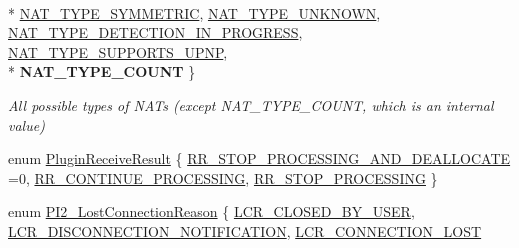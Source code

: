 \begin{DoxyCompactItemize}
\\*
\hyperlink{namespace_rak_net_a81848fd95488939c0b3e217209f31139a0fe9820fcb6c01ea039c04165f8a38f8}{N\-A\-T\-\_\-\-T\-Y\-P\-E\-\_\-\-S\-Y\-M\-M\-E\-T\-R\-I\-C}, 
\hyperlink{namespace_rak_net_a81848fd95488939c0b3e217209f31139a0f4cdc67acdc19e4287f0b44a0c91945}{N\-A\-T\-\_\-\-T\-Y\-P\-E\-\_\-\-U\-N\-K\-N\-O\-W\-N}, 
\hyperlink{namespace_rak_net_a81848fd95488939c0b3e217209f31139abd9c6bf5948fea28bf8d8513a4ef1b1d}{N\-A\-T\-\_\-\-T\-Y\-P\-E\-\_\-\-D\-E\-T\-E\-C\-T\-I\-O\-N\-\_\-\-I\-N\-\_\-\-P\-R\-O\-G\-R\-E\-S\-S}, 
\hyperlink{namespace_rak_net_a81848fd95488939c0b3e217209f31139a16b9a0a7400130f9f1b046426a8ae7d0}{N\-A\-T\-\_\-\-T\-Y\-P\-E\-\_\-\-S\-U\-P\-P\-O\-R\-T\-S\-\_\-\-U\-P\-N\-P}, 
\\*
{\bfseries N\-A\-T\-\_\-\-T\-Y\-P\-E\-\_\-\-C\-O\-U\-N\-T}
 \}
\begin{DoxyCompactList}\small\item\em All possible types of N\-A\-Ts (except N\-A\-T\-\_\-\-T\-Y\-P\-E\-\_\-\-C\-O\-U\-N\-T, which is an internal value) \end{DoxyCompactList}\item 
enum \hyperlink{group___p_l_u_g_i_n___i_n_t_e_r_f_a_c_e___g_r_o_u_p_ga89998adaafb29e5d879113b992161085}{Plugin\-Receive\-Result} \{ \hyperlink{group___p_l_u_g_i_n___i_n_t_e_r_f_a_c_e___g_r_o_u_p_gga89998adaafb29e5d879113b992161085afcd33db33aa6fdf749686a30ab2bddec}{R\-R\-\_\-\-S\-T\-O\-P\-\_\-\-P\-R\-O\-C\-E\-S\-S\-I\-N\-G\-\_\-\-A\-N\-D\-\_\-\-D\-E\-A\-L\-L\-O\-C\-A\-T\-E} =0, 
\hyperlink{group___p_l_u_g_i_n___i_n_t_e_r_f_a_c_e___g_r_o_u_p_gga89998adaafb29e5d879113b992161085a10d49b25874f0d9f5c420e3bf2e6c9d9}{R\-R\-\_\-\-C\-O\-N\-T\-I\-N\-U\-E\-\_\-\-P\-R\-O\-C\-E\-S\-S\-I\-N\-G}, 
\hyperlink{group___p_l_u_g_i_n___i_n_t_e_r_f_a_c_e___g_r_o_u_p_gga89998adaafb29e5d879113b992161085a9e014324e71812eabb1271984a12e238}{R\-R\-\_\-\-S\-T\-O\-P\-\_\-\-P\-R\-O\-C\-E\-S\-S\-I\-N\-G}
 \}
\item 
enum \hyperlink{group___p_l_u_g_i_n___i_n_t_e_r_f_a_c_e___g_r_o_u_p_ga376cc546fd6892c2ead48cd51796c8b8}{P\-I2\-\_\-\-Lost\-Connection\-Reason} \{ \hyperlink{group___p_l_u_g_i_n___i_n_t_e_r_f_a_c_e___g_r_o_u_p_gga376cc546fd6892c2ead48cd51796c8b8a6e61c0d570e2be4ee58ce7a58d782879}{L\-C\-R\-\_\-\-C\-L\-O\-S\-E\-D\-\_\-\-B\-Y\-\_\-\-U\-S\-E\-R}, 
\hyperlink{group___p_l_u_g_i_n___i_n_t_e_r_f_a_c_e___g_r_o_u_p_gga376cc546fd6892c2ead48cd51796c8b8a80ff559ada3a0030585a2afa8bdf46a7}{L\-C\-R\-\_\-\-D\-I\-S\-C\-O\-N\-N\-E\-C\-T\-I\-O\-N\-\_\-\-N\-O\-T\-I\-F\-I\-C\-A\-T\-I\-O\-N}, 
\hyperlink{group___p_l_u_g_i_n___i_n_t_e_r_f_a_c_e___g_r_o_u_p_gga376cc546fd6892c2ead48cd51796c8b8aff6f926616ed81a798b92aa6ee7f6b71}{L\-C\-R\-\_\-\-C\-O\-N\-N\-E\-C\-T\-I\-O\-N\-\_\-\-L\-O\-S\-T}

\end{DoxyCompactItemize}
